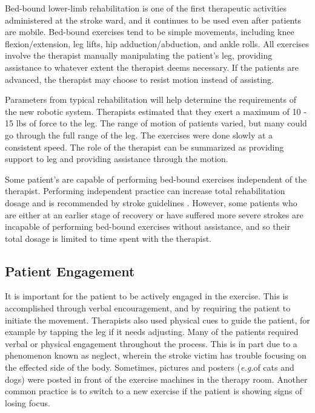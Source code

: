 \documentclass[12pt]{report}
\begin{document}
	Bed-bound lower-limb rehabilitation is one of the first therapeutic activities administered at the stroke ward, and it continues to be used even after patients are mobile. Bed-bound exercises tend to be simple movements, including knee flexion/extension, leg lifts, hip adduction/abduction, and ankle rolls. All exercises involve the therapist manually manipulating the patient's leg, providing assistance to whatever extent the therapist deems necessary. If the patients are advanced, the therapist may choose to resist motion instead of assisting. 
	
	Parameters from typical rehabilitation will help determine the requirements of the new robotic system. Therapists estimated that they exert a maximum of 10 - 15 lbs of force to the leg. The range of motion of patients varied, but many could go through the full range of the leg. The exercises were done slowly at a consistent speed. The role of the therapist can be summarized as providing support to leg and providing assistance through the motion. 
	
	Some patient's are capable of performing bed-bound exercises independent of the therapist. Performing independent practice can increase total rehabilitation dosage and is recommended by stroke guidelines \cite{Hebert2016}. However, some patients who are either at an earlier stage of recovery or have suffered more severe strokes are incapable of performing bed-bound exercises without assistance, and so their total dosage is limited to time spent with the therapist. 
	
	\subsection{Patient Engagement} 
	 It is important for the patient to be actively engaged in the exercise. This is accomplished through verbal encouragement, and by requiring the patient to initiate the movement. Therapists also used physical cues to guide the patient, for example by tapping the leg if it needs adjusting. Many of the patients required verbal or physical engagement throughout the process. This is in part due to a phenomenon known as neglect, wherein the stroke victim has trouble focusing on the effected side of the body. Sometimes, pictures and posters (\textit{e.g.}of cats and dogs) were posted in front of the exercise machines in the therapy room. Another common practice is to switch to a new exercise if the patient is showing signs of losing focus. 
	 
\end{document}
